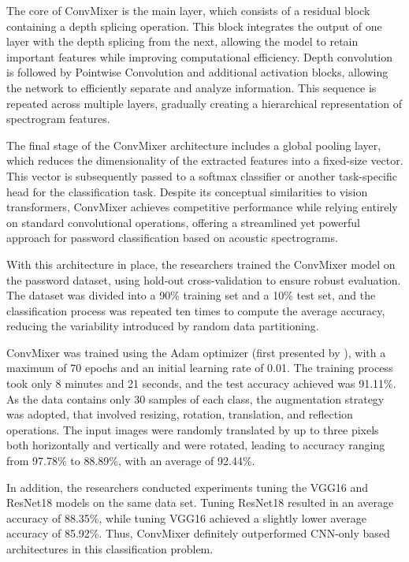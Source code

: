 \documentclass[a4paper,11pt,twoside]{report}
\theoremstyle{definition}
\begin{document}
The core of ConvMixer is the main layer, which consists of a residual block containing a depth splicing operation. This block integrates the output of one layer with the depth splicing from the next, allowing the model to retain important features while improving computational efficiency. Depth convolution is followed by Pointwise Convolution and additional activation blocks, allowing the network to efficiently separate and analyze information. This sequence is repeated across multiple layers, gradually creating a hierarchical representation of spectrogram features.

The final stage of the ConvMixer architecture includes a global pooling layer, which reduces the dimensionality of the extracted features into a fixed-size vector. This vector is subsequently passed to a softmax classifier or another task-specific head for the classification task. Despite its conceptual similarities to vision transformers, ConvMixer achieves competitive performance while relying entirely on standard convolutional operations, offering a streamlined yet powerful approach for password classification based on acoustic spectrograms.

With this architecture in place, the researchers trained the ConvMixer model on the password dataset, using hold-out cross-validation to ensure robust evaluation. The dataset was divided into a 90\% training set and a 10\% test set, and the classification process was repeated ten times to compute the average accuracy, reducing the variability introduced by random data partitioning.

ConvMixer was trained using the Adam optimizer (first presented by \textit{\cite{adamopt}}), with a maximum of 70 epochs and an initial learning rate of 0.01. The training process took only 8 minutes and 21 seconds, and the test accuracy achieved was 91.11\%. As the data contains only 30 samples of each class, the augmentation strategy was adopted, that involved resizing, rotation, translation, and reflection operations. The input images were randomly translated by up to three pixels both horizontally and vertically and were rotated, leading to accuracy ranging from 97.78\% to 88.89\%, with an average of 92.44\%.

In addition, the researchers conducted experiments tuning the VGG16 and ResNet18 models on the same data set. Tuning ResNet18 resulted in an average accuracy of 88.35\%, while tuning VGG16 achieved a slightly lower average accuracy of 85.92\%. Thus, ConvMixer definitely outperformed CNN-only based architectures in this classification problem. \\
\end{document}

